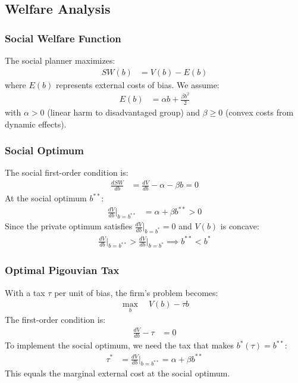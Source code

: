 \subsection{Welfare Analysis}

\subsubsection{Social Welfare Function}
The social planner maximizes:
\begin{align}
SW(b) &= V(b) - E(b)
\end{align}
where $E(b)$ represents external costs of bias. We assume:
\begin{align}
E(b) &= \alpha b + \frac{\beta b^2}{2}
\end{align}
with $\alpha > 0$ (linear harm to disadvantaged group) and $\beta \geq 0$ (convex costs from dynamic effects).

\subsubsection{Social Optimum}
The social first-order condition is:
\begin{align}
\frac{dSW}{db} &= \frac{dV}{db} - \alpha - \beta b = 0 \label{eq:social_foc}
\end{align}
At the social optimum $b^{**}$:
\begin{align}
\frac{dV}{db}\bigg|_{b=b^{**}} &= \alpha + \beta b^{**} > 0
\end{align}
Since the private optimum satisfies $\frac{dV}{db}\big|_{b=b^*} = 0$ and $V(b)$ is concave:
\begin{align}
\frac{dV}{db}\bigg|_{b=b^{**}} > \frac{dV}{db}\bigg|_{b=b^*} \implies b^{**} < b^*
\end{align}

\subsubsection{Optimal Pigouvian Tax}
With a tax $\tau$ per unit of bias, the firm's problem becomes:
\begin{align}
\max_b \quad V(b) - \tau b
\end{align}
The first-order condition is:
\begin{align}
\frac{dV}{db} - \tau &= 0
\end{align}
To implement the social optimum, we need the tax that makes $b^*(\tau) = b^{**}$:
\begin{align}
\tau^* &= \frac{dV}{db}\bigg|_{b=b^{**}} = \alpha + \beta b^{**}
\end{align}
This equals the marginal external cost at the social optimum.

